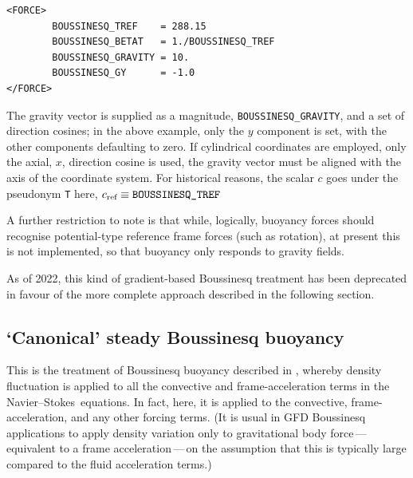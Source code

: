 \documentclass[11pt]{report}
\newcommand\NavSto{Navier--Stokes}
\begin{document}
\begin{verbatim}
<FORCE>
        BOUSSINESQ_TREF    = 288.15
        BOUSSINESQ_BETAT   = 1./BOUSSINESQ_TREF
        BOUSSINESQ_GRAVITY = 10.
        BOUSSINESQ_GY      = -1.0
</FORCE>
\end{verbatim}

The gravity vector is supplied as a magnitude,
\verb|BOUSSINESQ_GRAVITY|, and a set of direction cosines; in the
above example, only the $y$ component is set, with the other
components defaulting to zero.  If cylindrical coordinates are
employed, only the axial, $x$, direction cosine is used, \ie the
gravity vector must be aligned with the axis of the coordinate system.
For historical reasons, the scalar $c$ goes under the pseudonym
\verb|T| here, \ie $c_\textrm{ref}\equiv\verb|BOUSSINESQ_TREF|$

A further restriction to note is that while, logically, buoyancy
forces should recognise potential-type reference frame forces (such as
rotation), at present this is not implemented, so that buoyancy only
responds to gravity fields.

As of 2022, this kind of gradient-based Boussinesq treatment has been
deprecated in favour of the more complete approach described in the
following section.

\subsection{`Canonical' steady Boussinesq buoyancy}
\label{sec.csb}

This is the treatment of Boussinesq buoyancy described in
\citet{blss21}, whereby density fluctuation is applied to all the
convective and frame-acceleration terms in the \NavSto\ equations.  In
fact, here, it is applied to the convective, frame-acceleration,  and
any other forcing terms.  (It is usual in GFD Boussinesq applications
to apply density variation only to gravitational body
force\,---\,equivalent to a frame acceleration\,---\,on the assumption
that this is typically large compared to the fluid acceleration
terms.)
\end{document}
